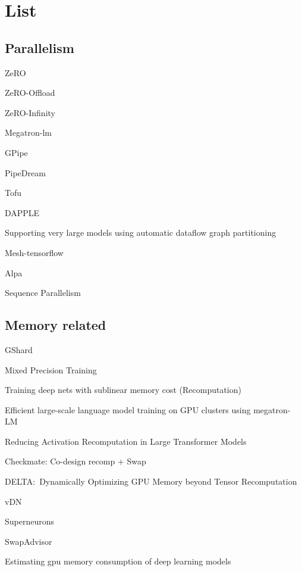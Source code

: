 \section{List}
\subsection{Parallelism}


ZeRO~\cite{zero}

ZeRO-Offload~\cite{zero-offload}

ZeRO-Infinity~\cite{zero-infinity}\

Megatron-lm~\cite{megatron-lm}

GPipe~\cite{gpipe,kim2020torchgpipe}

PipeDream~\cite{Narayanan2019PipeDream}

Tofu~\cite{Wang2018Tofu}

DAPPLE~\cite{fan2021dapple}

Supporting very large models using automatic dataflow graph partitioning~\cite{wang2019supporting}

Mesh-tensorflow~\cite{shazeer2018mesh}

Alpa~\cite{Zheng2022Alpa}

Sequence Parallelism~\cite{li2021sequence}


\subsection{Memory related}
GShard~\cite{lepikhin2020gshard}

Mixed Precision Training~\cite{micikevicius2017mixed}

Training deep nets with sublinear memory cost (Recomputation)~\cite{chen2016training}

Efficient large-scale language model training on GPU clusters using megatron-LM~\cite{narayanan2021efficient}

Reducing Activation Recomputation in Large Transformer Models~\cite{megatron3}

Checkmate: Co-design recomp + Swap~\cite{checkmate}

DELTA:\ Dynamically Optimizing GPU Memory beyond Tensor Recomputation~\cite{tang2022delta}

vDN~\cite{rhu2016vdnn}

Superneurons~\cite{wang2018superneurons}

SwapAdvisor~\cite{huang2020swapadvisor}

Estimating gpu memory consumption of deep learning models~\cite{gao2020estimating}

